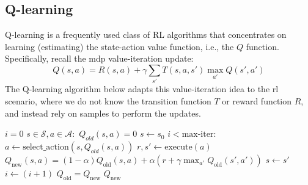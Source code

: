 \subsection{Q-learning}\label{sec-q_learning}
Q-learning is a frequently used class of RL algorithms that
concentrates on learning (estimating) the state-action value function, i.e.,
the $Q$ function. Specifically, recall the {\sc mdp} value-iteration update:
\begin{equation}
  Q(s,a) = R(s,a) + \gamma \sum_{s'} T(s,a,s')\max_{a'}Q(s',a')
\end{equation}
The Q-learning algorithm below adapts this value-iteration idea to the
  {\sc rl} scenario, where we do not know the transition function $T$ or
reward function $R$, and instead rely on samples to perform the updates.
\begin{codebox}
  \label{proc:Q_learn}
  \li $i=0$ 
  \li \For $s \in \mathcal{S}, a \in \mathcal{A}:$
  \li   \Do
  ${Q_{old}}(s, a) = 0$
  \End
  \li $s \gets s_0$
  \li \While $i < \text{max-iter}$:
  \li \Do
  $a \gets \text{select}\_\text{action}(s, {Q_{old}}(s, a))$
  \li     $r,s' \gets \text{execute}(a)$
  \li     ${Q}_{\text{new}}(s, a) = (1-\alpha){Q}_{\text{old}}(s, a)
    + \alpha(r + \gamma \max_{a'}{Q}_{\text{old}}(s', a'))$
  \li $s \gets s'$
  \li $i \gets (i+1)$
  \li      $Q_{\text{old}} = Q_{\text{new}}$
  \End
  \li \Return $Q_{\text{new}}$
  \End
\end{codebox}

